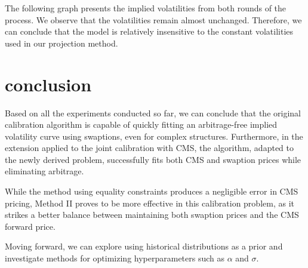 The following graph presents the implied volatilities from both rounds of the process. We observe that the volatilities remain almost unchanged. Therefore, we can conclude that the model is relatively insensitive to the constant volatilities used in our projection method.

\section{conclusion}
Based on all the experiments conducted so far, we can conclude that the original calibration algorithm is capable of quickly fitting an arbitrage-free implied volatility curve using swaptions, even for complex structures. Furthermore, in the extension applied to the joint calibration with CMS, the algorithm, adapted to the newly derived problem, successfully fits both CMS and swaption prices while eliminating arbitrage.

While the method using equality constraints produces a negligible error in CMS pricing, Method II proves to be more effective in this calibration problem, as it strikes a better balance between maintaining both swaption prices and the CMS forward price.

Moving forward, we can explore using historical distributions as a prior and investigate methods for optimizing hyperparameters such as \(\alpha\) and \(\sigma\).





